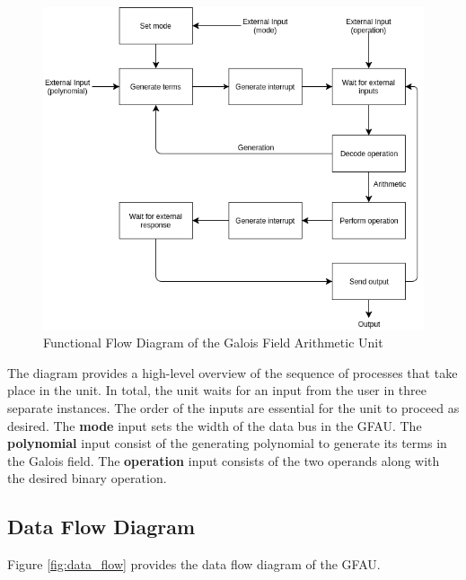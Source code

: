 \documentclass[12pt]{extarticle}
\newcommand{\team}{Galois Field Arithmetic Unit}
\begin{document}
        \begin{figure}[ht]
            \begin{center}
                \includegraphics[width=1\textwidth]{functional_flow.png}
                \caption{Functional Flow Diagram of the \team~}
                \label{fig:functional_flow}
            \end{center}
        \end{figure}

        The diagram provides a high-level overview of the sequence of processes
        that take place in the unit. In total, the unit waits for an input from
        the user in three separate instances. The order of the inputs are
        essential for the unit to proceed as desired. The \textbf{mode} input
        sets the width of the data bus in the GFAU. The \textbf{polynomial}
        input consist of the generating polynomial to generate its terms in the
        Galois field. The \textbf{operation} input consists of the two operands
        along with the desired binary operation.
        \newpage

        \subsection{Data Flow Diagram} Figure \ref{fig:data_flow} provides the
        data flow diagram of the GFAU.
\end{document}
